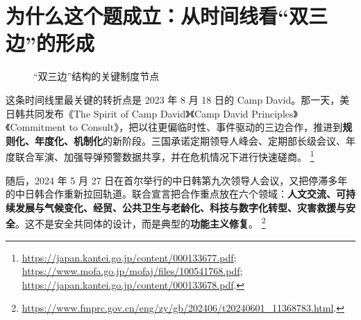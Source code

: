\documentclass[a4paper]{article}
\begin{document}
\section{为什么这个题成立：从时间线看“双三边”的形成}

\begin{figure}[H]
\centering
{}
\caption{“双三边”结构的关键制度节点}
\end{figure}

这条时间线里最关键的转折点是 2023 年 8 月 18 日的 Camp David。那一天，美日韩共同发布《The Spirit of Camp David》《Camp David Principles》《Commitment to Consult》，把以往更偏临时性、事件驱动的三边合作，推进到\textbf{规则化、年度化、机制化}的新阶段。三国承诺定期领导人峰会、定期部长级会议、年度联合军演、加强导弹预警数据共享，并在危机情况下进行快速磋商。%
\footnote{\url{https://japan.kantei.go.jp/content/000133677.pdf}; \url{https://www.mofa.go.jp/mofaj/files/100541768.pdf}; \url{https://japan.kantei.go.jp/content/000133678.pdf}.}

随后，2024 年 5 月 27 日在首尔举行的中日韩第九次领导人会议，又把停滞多年的中日韩合作重新拉回轨道。联合宣言把合作重点放在六个领域：\textbf{人文交流、可持续发展与气候变化、经贸、公共卫生与老龄化、科技与数字化转型、灾害救援与安全}。这不是安全共同体的设计，而是典型的\textbf{功能主义修复}。%
\footnote{\url{https://www.fmprc.gov.cn/eng/zy/gb/202406/t20240601_11368783.html}.}
\end{document}
